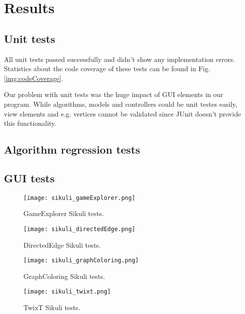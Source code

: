 \section{Results}
\label{section:results}

\subsection{Unit tests}

All unit tests passed successfully and didn't show any implementation errors. Statistics about the code coverage of these tests can be found in Fig. \ref{img:codeCoverage}.\par
Our problem with unit tests was the huge impact of GUI elements in our program. While algorithms, models and controllers could be unit testes easily, view elements and e.g. vertices cannot be validated since JUnit doesn't provide this functionality.\par

\subsection{Algorithm regression tests}


\subsection{GUI tests}


\begin{figure}[!h]
	\texttt{[image: sikuli\_gameExplorer.png]}
	\caption{GameExplorer Sikuli tests.}
	\label{img:sikuliGameExplorer}
\end{figure}

\begin{figure}[!h]
	\texttt{[image: sikuli\_directedEdge.png]}
	\caption{DirectedEdge Sikuli tests.}
	\label{img:sikuliDirectedEdge}
\end{figure}

\begin{figure}[!h]
	\texttt{[image: sikuli\_graphColoring.png]}
	\caption{GraphColoring Sikuli tests.}
	\label{img:sikuliGraphColoring}
\end{figure}

\begin{figure}[!h]
	\texttt{[image: sikuli\_twixt.png]}
	\caption{TwixT Sikuli tests.}
	\label{img:sikuliTwixt}
\end{figure}

